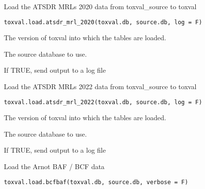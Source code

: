 \documentclass[letterpaper]{book}
\begin{document}
%
\begin{Description}\relax
Load the ATSDR MRLs 2020 data from toxval\_source to toxval
\end{Description}
%
\begin{Usage}
\begin{verbatim}
toxval.load.atsdr_mrl_2020(toxval.db, source.db, log = F)
\end{verbatim}
\end{Usage}
%
\begin{Arguments}
\begin{ldescription}
\item[\code{toxval.db}] The version of toxval into which the tables are loaded.

\item[\code{source.db}] The source database to use.

\item[\code{log}] If TRUE, send output to a log file
\end{ldescription}
\end{Arguments}
%
\begin{Description}\relax
Load the ATSDR MRLs 2022 data from toxval\_source to toxval
\end{Description}
%
\begin{Usage}
\begin{verbatim}
toxval.load.atsdr_mrl_2022(toxval.db, source.db, log = F)
\end{verbatim}
\end{Usage}
%
\begin{Arguments}
\begin{ldescription}
\item[\code{toxval.db}] The version of toxval into which the tables are loaded.

\item[\code{source.db}] The source database to use.

\item[\code{log}] If TRUE, send output to a log file
\end{ldescription}
\end{Arguments}
%
\begin{Description}\relax
Load the Arnot BAF / BCF data
\end{Description}
%
\begin{Usage}
\begin{verbatim}
toxval.load.bcfbaf(toxval.db, source.db, verbose = F)
\end{verbatim}
\end{Usage}
\end{document}
